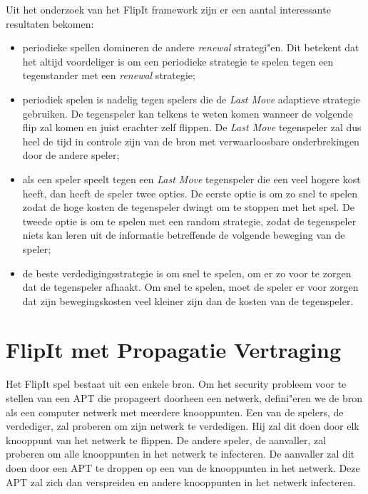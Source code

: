 \documentclass[master=cws, masteroption=vs,english]{kulemt}
\begin{document}
\begin{abstract*}
Uit het onderzoek van het FlipIt framework zijn er een aantal interessante resultaten bekomen:
\begin{itemize}
\item periodieke spellen domineren de andere \textit{renewal }strategi"en. Dit betekent dat het altijd voordeliger is om een periodieke strategie te spelen tegen een tegenstander met een \textit{renewal} strategie;
\item periodiek spelen is nadelig tegen spelers die de\textit{ Last Move} adaptieve strategie gebruiken. De tegenspeler kan telkens te weten komen wanneer de volgende flip zal komen en juist erachter zelf flippen. De \textit{Last Move} tegenspeler zal dus heel de tijd in controle zijn van de bron met verwaarloosbare onderbrekingen door de andere speler;
\item als een speler speelt tegen een \textit{Last Move} tegenspeler die een veel hogere kost heeft, dan heeft de speler twee opties. De eerste optie is om zo snel te spelen zodat de hoge kosten de tegenspeler dwingt om te stoppen met het spel. De tweede optie is om te spelen met een random strategie, zodat de tegenspeler niets kan leren uit de informatie betreffende de volgende beweging van de speler;
\item de beste verdedigingsstrategie is om snel te spelen, om er zo voor te zorgen dat de tegenspeler afhaakt. Om snel te spelen, moet de speler er voor zorgen dat zijn bewegingskosten veel kleiner zijn dan de kosten van de tegenspeler.
\end{itemize}


\section {FlipIt met Propagatie Vertraging}
\label{ch: flipitvirus}
Het FlipIt spel bestaat uit een enkele bron. Om het security probleem voor te stellen van een APT die propageert doorheen een netwerk, defini"eren we de bron als een computer netwerk met meerdere knooppunten. Een van de spelers, de verdediger, zal proberen om zijn netwerk te verdedigen. Hij zal dit doen door elk knooppunt van het netwerk te flippen. De andere speler, de aanvaller, zal proberen om alle knooppunten in het netwerk te infecteren. De aanvaller zal dit doen door een APT te droppen op een van de knooppunten in het netwerk. Deze APT zal zich dan verspreiden en andere knooppunten in het netwerk infecteren. \\


\end{abstract*}
\end{document}
